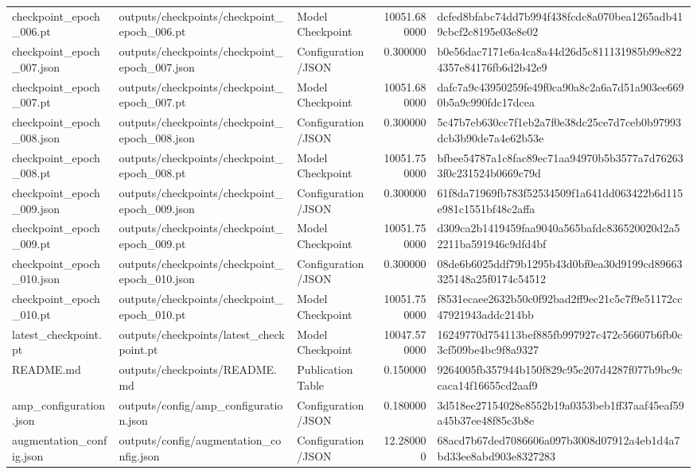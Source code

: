 \begin{tabular}{lllrl}
checkpoint\_epoch\_006.pt & outputs/checkpoints/checkpoint\_epoch\_006.pt & Model Checkpoint & 10051.680000 & dcfed8bfabc74dd7b994f438fcdc8a070bea1265adb419cbcf2c8195e03e8e02 \\
checkpoint\_epoch\_007.json & outputs/checkpoints/checkpoint\_epoch\_007.json & Configuration/JSON & 0.300000 & b0e56dac7171e6a4ca8a44d26d5c811131985b99e8224357e84176fb6d2b42e9 \\
checkpoint\_epoch\_007.pt & outputs/checkpoints/checkpoint\_epoch\_007.pt & Model Checkpoint & 10051.680000 & dafc7a9c43950259fe49f0ca90a8c2a6a7d51a903ee6690b5a9c990fdc17dcea \\
checkpoint\_epoch\_008.json & outputs/checkpoints/checkpoint\_epoch\_008.json & Configuration/JSON & 0.300000 & 5c47b7eb630cc7f1eb2a7f0e38dc25ce7d7ceb0b97993dcb3b90de7a4e62b53e \\
checkpoint\_epoch\_008.pt & outputs/checkpoints/checkpoint\_epoch\_008.pt & Model Checkpoint & 10051.750000 & bfbee54787a1c8fac89ec71aa94970b5b3577a7d762633f0c231524b0669c79d \\
checkpoint\_epoch\_009.json & outputs/checkpoints/checkpoint\_epoch\_009.json & Configuration/JSON & 0.300000 & 61f8da71969fb783f52534509f1a641dd063422b6d115e981c1551bf48c2affa \\
checkpoint\_epoch\_009.pt & outputs/checkpoints/checkpoint\_epoch\_009.pt & Model Checkpoint & 10051.750000 & d309ca2b1419459faa9040a565bafdc836520020d2a52211ba591946c9dfd4bf \\
checkpoint\_epoch\_010.json & outputs/checkpoints/checkpoint\_epoch\_010.json & Configuration/JSON & 0.300000 & 08de6b6025ddf79b1295b43d0bf0ea30d9199cd89663325148a25f0174c54512 \\
checkpoint\_epoch\_010.pt & outputs/checkpoints/checkpoint\_epoch\_010.pt & Model Checkpoint & 10051.750000 & f8531ecaee2632b50c0f92bad2ff9ec21c5c7f9e51172cc47921943addc214bb \\
latest\_checkpoint.pt & outputs/checkpoints/latest\_checkpoint.pt & Model Checkpoint & 10047.570000 & 16249770d754113bef885fb997927c472c56607b6fb0c3cf509be4bc9f8a9327 \\
README.md & outputs/checkpoints/README.md & Publication Table & 0.150000 & 9264005fb357944b150f829c95e207d4287f077b9bc9ccaca14f16655cd2aaf9 \\
amp\_configuration.json & outputs/config/amp\_configuration.json & Configuration/JSON & 0.180000 & 3d518ee27154028e8552b19a0353beb1ff37aaf45eaf59a45b37ee48f85c3b8e \\
augmentation\_config.json & outputs/config/augmentation\_config.json & Configuration/JSON & 12.280000 & 68acd7b67ded7086606a097b3008d07912a4eb1d4a7bd33ee8abd903e8327283 \\
\bottomrule
\end{tabular}
